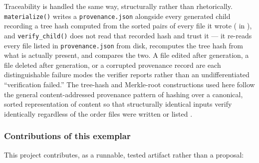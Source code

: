 \documentclass[
]{article}
\begin{document}
Traceability is handled the same way, structurally rather than
rhetorically. \texttt{materialize()} writes a \texttt{provenance.json}
alongside every generated child recording a tree hash computed from the
sorted  pairs of every file it wrote
( in
), and \texttt{verify\_child()} does not read
that recorded hash and trust it --- it re-reads every file listed in
\texttt{provenance.json} from disk, recomputes the tree hash from what
is actually present, and compares the two. A file edited after
generation, a file deleted after generation, or a corrupted provenance
record are each distinguishable failure modes the verifier reports
rather than an undifferentiated ``verification failed.'' The tree-hash
and Merkle-root constructions used here follow the general
content-addressed provenance pattern of hashing over a canonical, sorted
representation of content so that structurally identical inputs verify
identically regardless of the order files were written or listed
\citep{merkle_tree_provenance}.

\subsubsection{Contributions of this
exemplar}\label{contributions-of-this-exemplar}

This project contributes, as a runnable, tested artifact rather than a
proposal:
\end{document}
